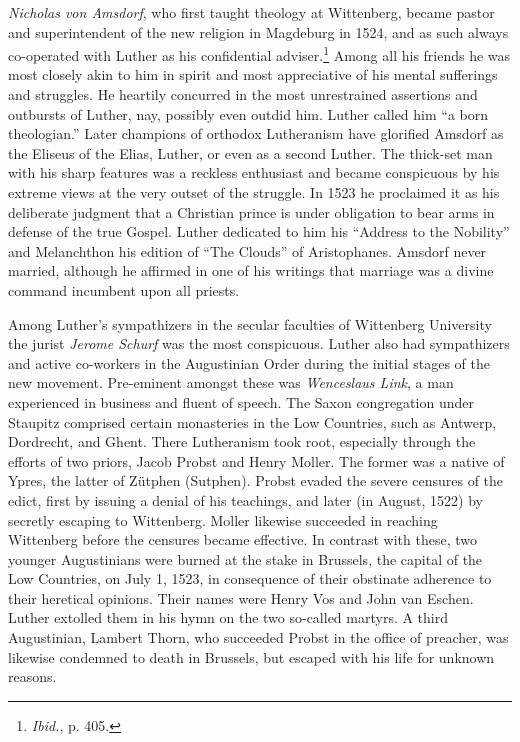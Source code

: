 \textit{Nicholas von Amsdorf}, who first taught theology at Wittenberg,
became pastor and superintendent of the new religion in Magdeburg
in 1524, and as such always co-operated with Luther as his confidential
adviser.\footnote{\textit{Ibid.}, p. 405.}
Among all his friends he was most closely akin
to him in spirit and most appreciative of his mental sufferings and
struggles. He heartily concurred in the most unrestrained assertions
and outbursts of Luther, nay, possibly even outdid him. Luther
called him “a born theologian.” Later champions of orthodox
Lutheranism have glorified Amsdorf as the Eliseus of the Elias,
Luther, or even as a second Luther. The thick-set man with his
sharp features was a reckless enthusiast and became conspicuous by
his extreme views at the very outset of the struggle. In 1523 he
proclaimed it as his deliberate judgment that a Christian prince
is under obligation to bear arms in defense of the true Gospel. Luther
dedicated to him his “Address to the Nobility” and Melanchthon
his edition of “The Clouds” of Aristophanes. Amsdorf never married,
although he affirmed in one of his writings that marriage was a
divine command incumbent upon all priests.

Among Luther’s sympathizers in the secular faculties of Wittenberg University
the jurist \textit{Jerome Schurf} was the most conspicuous.
Luther also had sympathizers and active co-workers in the Augustinian
Order during the initial stages of the new movement.
Pre-eminent amongst these was \textit{Wenceslaus Link}, a man experienced
in business and fluent of speech. The Saxon congregation under
Staupitz comprised certain monasteries in the Low Countries, such
as Antwerp, Dordrecht, and Ghent. There Lutheranism took root,
especially through the efforts of two priors, Jacob Probst and Henry
Moller. The former was a native of Ypres, the latter of Zütphen
(Sutphen). Probst evaded the severe censures of the edict, first by
issuing a denial of his teachings, and later (in August, 1522) by secretly
escaping to Wittenberg. Moller likewise succeeded in reaching
Wittenberg before the censures became effective. In contrast with
these, two younger Augustinians were burned at the stake in Brussels,
the capital of the Low Countries, on July 1, 1523, in consequence
of their obstinate adherence to their heretical opinions. Their names
were Henry Vos and John van Eschen. Luther extolled them in his
hymn on the two so-called martyrs. A third Augustinian, Lambert
Thorn, who succeeded Probst in the office of preacher, was likewise condemned
to death in Brussels, but escaped with his life for
unknown reasons.

